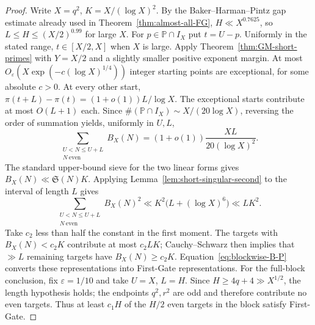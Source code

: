 \documentclass[final,11pt]{elsarticle}
\theoremstyle{definition}
\theoremstyle{remark}
\newcommand{\PP}{\mathbb{P}}
\newcommand{\Sg}{\mathfrak{S}}
\newcommand{\eps}{\varepsilon}
\numberwithin{equation}{section}
\begin{document}
\begin{proof}
Write $X=q^2$, $K=X/(\log X)^2$.  By the Baker--Harman--Pintz
gap estimate already used in Theorem~\ref{thm:almost-all-FG},
$H\ll X^{0.7625}$, so $L\le H\le (X/2)^{0.99}$ for large $X$.
For $p\in\PP\cap I_X$ put $t=U-p$.  Uniformly in the stated range,
$t\in[X/2,X]$ when $X$ is large.  Apply Theorem~\ref{thm:GM-short-primes}
with $Y=X/2$ and a slightly smaller positive exponent margin.
At most $O_\eps(X\exp(-c(\log X)^{1/4}))$ integer starting
points are exceptional, for some absolute $c>0$.  At every other
start, $\pi(t+L)-\pi(t)=(1+o(1))L/\log X$.
The exceptional starts contribute at most $O(L+1)$ each.
Since $\#(\PP\cap I_X)\sim X/(20\log X)$, reversing the order
of summation yields, uniformly in $U,L$,
\begin{equation}\label{eq:local-short-first-moment}
 \sum_{\substack{U<N\le U+L\\N\ \mathrm{even}}} B_X(N)
   =(1+o(1))\frac{XL}{20(\log X)^2}.
\end{equation}
The standard upper-bound sieve for the two linear forms gives $B_X(N)\ll\Sg(N)K$.  Applying
Lemma~\ref{lem:short-singular-second} to the interval of length $L$
gives
\[
 \sum_{\substack{U<N\le U+L\\N\ \mathrm{even}}}B_X(N)^2
   \ll K^2\bigl(L+(\log X)^6\bigr)\ll LK^2.
\]
Take $c_2$ less than half the constant in the first moment.
The targets with $B_X(N)<c_2K$ contribute at most $c_2LK$;
Cauchy--Schwarz then implies that $\gg L$ remaining targets
have $B_X(N)\ge c_2K$.  Equation~\eqref{eq:blockwise-B-P}
converts these representations into First-Gate representations.
For the full-block conclusion, fix $\eps=1/10$ and take
$U=X$, $L=H$. Since $H\ge4q+4\gg X^{1/2}$, the length
hypothesis holds; the endpoints $q^2,r^2$ are odd and therefore
contribute no even targets. Thus at least $c_1H$ of the $H/2$
even targets in the block satisfy First-Gate.
\end{proof}
\end{document}
